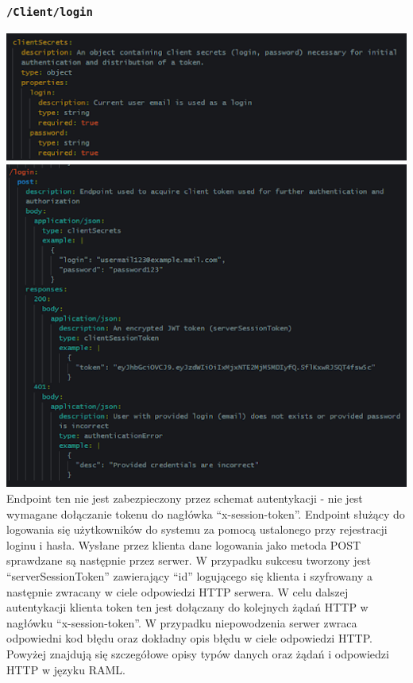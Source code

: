 \documentclass{article}
\begin{document}
\subsubsection{\texttt{/Client/login}}
\includegraphics[width=\linewidth]{Client login + authentication/client_secrets.png}
\newline
\includegraphics[width=\linewidth]{Client login + authentication/client_login.png}
\indent Endpoint ten nie jest zabezpieczony przez schemat autentykacji - nie jest wymagane dołączanie tokenu do nagłówka “x-session-token”.
\newline
\indent Endpoint służący do logowania się użytkowników do systemu za pomocą ustalonego przy rejestracji loginu i hasła. Wysłane przez klienta dane logowania jako metoda POST sprawdzane są następnie przez serwer. W przypadku sukcesu tworzony jest “serverSessionToken” zawierający “id” logującego się klienta i szyfrowany a następnie zwracany w ciele odpowiedzi HTTP serwera. W celu dalszej autentykacji klienta token ten jest dołączany do kolejnych żądań HTTP w nagłówku “x-session-token”. W przypadku niepowodzenia serwer zwraca odpowiedni kod błędu oraz dokładny opis błędu w ciele odpowiedzi HTTP.
Powyżej znajdują się szczegółowe opisy typów danych oraz żądań i odpowiedzi HTTP w języku RAML.
\end{document}
